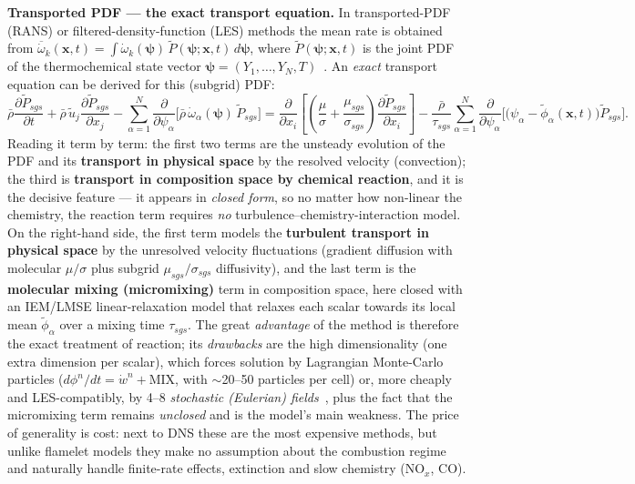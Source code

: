 {\textbf{Transported PDF --- the exact transport equation.} In transported-PDF (RANS) or filtered-density-function (LES) methods the mean rate is obtained from $\overline{\dot\omega}_k(\mathbf{x},t) = \int \dot\omega_k(\boldsymbol\psi)\,\tilde P(\boldsymbol\psi;\mathbf{x},t)\,d\boldsymbol\psi$, where $\tilde P(\boldsymbol\psi;\mathbf{x},t)$ is the joint PDF of the thermochemical state vector $\boldsymbol\psi=(Y_1,\dots,Y_N,T)$~\cite{lecture10,pope1985pdf,haworth2010pdf}. An \emph{exact} transport equation can be derived for this (subgrid) PDF:
\begin{equation*}
\bar\rho\frac{\partial \tilde P_{sgs}}{\partial t} + \bar\rho\,\tilde u_j \frac{\partial \tilde P_{sgs}}{\partial x_j} - \sum_{\alpha=1}^{N}\frac{\partial}{\partial \psi_\alpha}\!\Big[\bar\rho\,\dot\omega_\alpha(\boldsymbol\psi)\,\tilde P_{sgs}\Big] = \frac{\partial}{\partial x_i}\!\left[\left(\frac{\mu}{\sigma}+\frac{\mu_{sgs}}{\sigma_{sgs}}\right)\frac{\partial \tilde P_{sgs}}{\partial x_i}\right] - \frac{\bar\rho}{\tau_{sgs}}\sum_{\alpha=1}^{N}\frac{\partial}{\partial \psi_\alpha}\!\Big[\big(\psi_\alpha - \tilde\phi_\alpha(\mathbf{x},t)\big)\tilde P_{sgs}\Big].
\end{equation*}
Reading it term by term: the first two terms are the unsteady evolution of the PDF and its \textbf{transport in physical space} by the resolved velocity (convection); the third is \textbf{transport in composition space by chemical reaction}, and it is the decisive feature --- it appears in \emph{closed form}, so no matter how non-linear the chemistry, the reaction term requires \emph{no} turbulence--chemistry-interaction model. On the right-hand side, the first term models the \textbf{turbulent transport in physical space} by the unresolved velocity fluctuations (gradient diffusion with molecular $\mu/\sigma$ plus subgrid $\mu_{sgs}/\sigma_{sgs}$ diffusivity), and the last term is the \textbf{molecular mixing (micromixing)} term in composition space, here closed with an IEM/LMSE linear-relaxation model that relaxes each scalar towards its local mean $\tilde\phi_\alpha$ over a mixing time $\tau_{sgs}$. The great \emph{advantage} of the method is therefore the exact treatment of reaction; its \emph{drawbacks} are the high dimensionality (one extra dimension per scalar), which forces solution by Lagrangian Monte-Carlo particles ($d\phi^n/dt = \dot w^n + \mathrm{MIX}$, with $\sim$20--50 particles per cell) or, more cheaply and LES-compatibly, by 4--8 \emph{stochastic (Eulerian) fields}~\cite{lecture10,jones2014les}, plus the fact that the micromixing term remains \emph{unclosed} and is the model's main weakness. The price of generality is cost: next to DNS these are the most expensive methods, but unlike flamelet models they make no assumption about the combustion regime and naturally handle finite-rate effects, extinction and slow chemistry (NO$_x$, CO).
}

